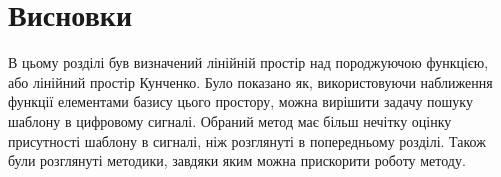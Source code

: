     \clearpage
\section{Висновки}
В цьому розділі був визначений лінійній простір над породжуючою функцією, або лінійний простір Кунченко.
Було показано як, використовуючи наближення функції елементами базису цього простору, можна вирішити задачу пошуку
шаблону в цифровому сигналі.
Обраний метод має більш нечітку оцінку присутності шаблону в сигналі, ніж розглянуті в попередньому розділі.
Також були розглянуті методики, завдяки яким можна прискорити роботу методу.

